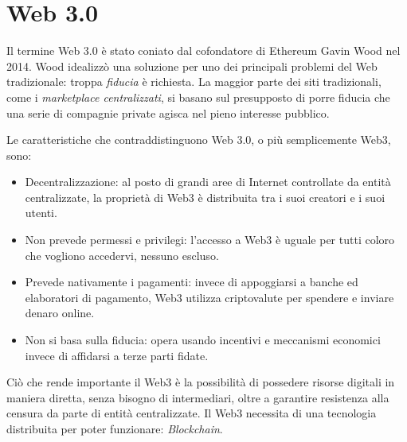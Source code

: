 \section{Web 3.0}
\label{sec:web3}
Il termine Web 3.0 è stato coniato dal cofondatore di Ethereum Gavin Wood nel 2014. Wood idealizzò una soluzione per uno dei principali problemi del Web tradizionale: troppa \textit{fiducia} è richiesta. La maggior parte dei siti tradizionali, come i \textit{marketplace centralizzati}, si basano sul presupposto di porre fiducia che una serie di compagnie private agisca nel pieno interesse pubblico. \cite{web3-ethereum}

Le caratteristiche che contraddistinguono Web 3.0, o più semplicemente Web3, sono:
\begin{itemize}
    \item Decentralizzazione: al posto di grandi aree di Internet controllate da entità centralizzate, la proprietà di Web3 è distribuita tra i suoi creatori e i suoi utenti.
    \item Non prevede permessi e privilegi: l'accesso a Web3 è uguale per tutti coloro che vogliono accedervi, nessuno escluso.
    \item Prevede nativamente i pagamenti: invece di appoggiarsi a banche ed elaboratori di pagamento, Web3 utilizza criptovalute per spendere e inviare denaro online.
    \item Non si basa sulla fiducia: opera usando incentivi e meccanismi economici invece di affidarsi a terze parti fidate.
\end{itemize}
Ciò che rende importante il Web3 è la possibilità di possedere risorse digitali in maniera diretta, senza bisogno di intermediari, oltre a garantire resistenza alla censura da parte di entità centralizzate.
Il Web3 necessita di una tecnologia distribuita per poter funzionare: \textit{Blockchain}. \cite{web3-ethereum}
